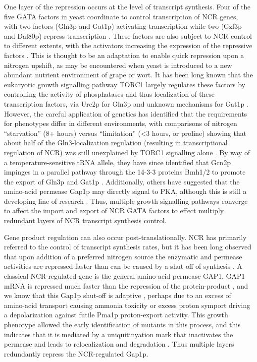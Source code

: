 One layer of
the repression occurs at the level of transcript synthesis. Four of
the five GATA factors in yeast coordinate to control transcription of
NCR genes, with two factors (Gln3p and Gat1p) activating transcription
while two (Gzf3p and Dal80p) repress transcription 
\parencite{hahn2011transcriptional,stanbrough1995transcriptional,daugherty1993regulatory,scherens2006identification}. 
These factors are also subject to NCR
control to different extents, with the activators increasing the
expression of the repressive factors 
\parencite{cunningham2000nitrogen}. 
This is thought to be an
adaptation to enable quick repression upon a nitrogen upshift, as may
be encountered when yeast is introduced to a new abundant nutrient
environment of grape or wort. It has been long known that the
eukaryotic growth signalling pathway TORC1 largely regulates these
factors by controlling the activity of phosphatases and thus
localization of these transcription factors, via Ure2p for Gln3p 
\parencite{beck1999tor,cox2000saccharomyces} 
and unknown mechanisms for Gat1p
\parencite{georis2008tor}. 
However, the careful application of genetics has identified that the
requirements for phenotypes differ in different environments, with
comparisons of nitrogen “starvation” (8+ hours) versus “limitation”
(<3 hours, or proline) showing that about half of the
Gln3-localization regulation (resulting in transcriptional regulation
of NCR) was still unexplained by TORC1 signalling alone
\parencite{tate2013five}. By way
of a temperature-sensitive tRNA allele, they have since identified
that Gcn2p impinges in a parallel pathway through the 14-3-3 proteins
Bmh1/2 to promote the export of Gln3p and Gat1p 
\parencite{tate2015gata,tate2017general}. 
Additionally, others have suggested that the
amino-acid permease Gap1p may directly signal to PKA, although this is
still a developing line of research
\parencite{donaton2003gap1,van2009transport}.
Thus, multiple growth signalling pathways converge to
affect the import and export of NCR GATA factors to effect multiply
redundant layers of NCR transcript synthesis control.  

Gene product
regulation can also occur post-translationally. NCR has primarily
referred to the control of transcript synthesis rates, but it has been
long observed that upon addition of a preferred nitrogen source the
enzymatic and permease activities are repressed faster than can be
caused by a shut-off of synthesis 
\parencite{cooper1983function}. A
classical NCR-regulated gene is the general amino-acid permease GAP1.
GAP1 mRNA is repressed much faster than the repression of the
protein-product 
\parencite{stanbrough1995transcriptional}, and we know that this
Gap1p shut-off is adaptive \parencite{risinger2006activity}, 
perhaps due to an
excess of amino-acid transport causing ammonia toxicity 
\parencite{hess2006ammonium}
or excess proton symport driving a depolarization against futile
Pma1p proton-export activity. This growth phenotype allowed the early
identification of mutants in this process, and this indicates that it
is mediated by a uniquitinyation mark that inactivates the permease
and leads to relocalization and degradation 
\parencite{grenson1983inactivation,risinger2008different,merhi2012internal}. 
Thus multiple layers redundantly repress the NCR-regulated Gap1p.  

